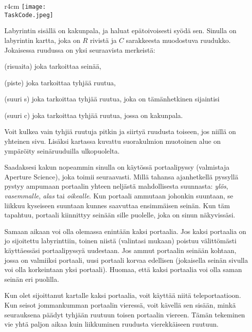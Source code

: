 \documentclass{boi2014-fi}
\renewcommand{\TaskCode}{portals}
\newcommand{\constant}[1]{{\tt #1}}
\begin{document}
    \begin{wrapfigure}[4]{r}{4cm}
        \vspace{-24pt}
\texttt{[image: \\TaskCode.jpeg]}
\end{wrapfigure}

    Labyrintin sisällä on kakunpala, ja haluat epätoivoisesti syödä sen.
    Sinulla on labyrintin kartta, joka on $R$ rivistä ja $C$ sarakkeesta
    muodostuva ruudukko.
    Jokaisessa ruudussa on yksi seuraavista merkeistä:

    \begin{description}[itemindent=1pt]
     \item[\constant{\#}] (risuaita) joka tarkoittaa seinää,
        \item[\constant{.}] (piste) joka tarkoittaa tyhjää ruutua,
        \item[\constant{S}] (suuri s) joka tarkoittaa tyhjää ruutua,
        joka on tämänhetkinen sijaintisi
        \item[\constant{C}] (suuri c) joka tarkoittaa tyhjää ruutua,
        jossa on kakunpala.
    \end{description}

    Voit kulkea vain tyhjiä ruutuja pitkin ja siirtyä ruudusta toiseen,
    jos niillä on yhteinen sivu. Lisäksi kartassa kuvattu suorakulmion
    muotoinen alue on ympäröity seinäruuduilla ulkopuolelta.

    Saadaksesi kakun nopeammin sinulla on käytössä portaalipyssy
    (valmistaja Aperture Science\texttrademark{}), joka toimii seuraavasti.
    Millä tahansa ajanhetkellä pyssyllä pystyy ampumaan portaalin
    yhteen neljästä mahdollisesta suunnasta: \emph{ylös}, \emph{vasemmalle},
    \emph{alas} tai \emph{oikealle}. Kun portaali ammutaan johonkin suuntaan,
    se liikkuu kyseiseen suuntaan kunnes saavuttaa ensimmäisen seinän.
    Kun täm tapahtuu, portaali kiinnittyy seinään sille puolelle,
    joka on sinun näkyvissäsi.

    Samaan aikaan voi olla olemassa enintään kaksi portaalia.
    Jos kaksi portaalia on jo sijoitettu labyrinttiin,
    toinen niistä (valintasi mukaan) poistuu välittömästi
    käyttäessäsi portaalipyssyä uudestaan.
    Jos ammut portaalin seinään kohtaan, jossa on valmiiksi portaali,
    uusi portaali korvaa edellisen (jokaisella seinän sivulla voi
    olla korkeintaan yksi portaali). Huomaa, että kaksi portaalia
    voi olla saman seinän eri puolilla.

    Kun olet sijoittanut kartalle kaksi portaalia,
    voit käyttää niitä teleportaatioon.
    Kun seisot jommankumman portaalin vieressä,
    voit kävellä sen sisään, minkä seurauksena päädyt
    tyhjään ruutuun toisen portaalin viereen.
    Tämän tekeminen vie yhtä paljon aikaa kuin liikkuminen
    ruudusta vierekkäiseen ruutuun.
\end{document}
